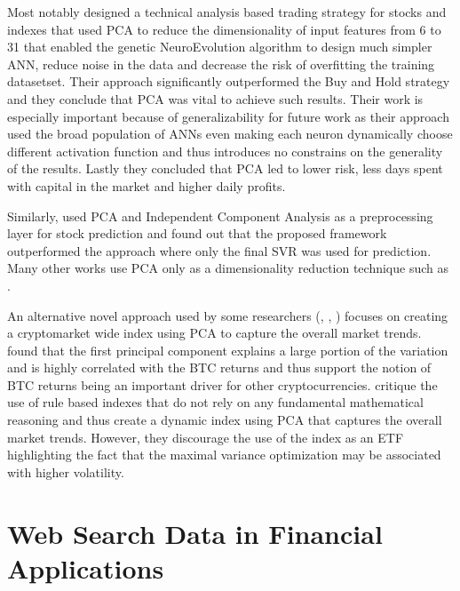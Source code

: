 Most notably \cite{Nadkarni2018} designed a technical analysis based trading 
strategy for stocks and indexes that used \ac{PCA} to reduce the dimensionality
of input features from 6 to 31 that enabled the genetic NeuroEvolution algorithm
to design much simpler \ac{ANN}, reduce noise in the data and decrease 
the risk of overfitting the training datasetset. Their approach significantly 
outperformed the Buy and Hold strategy and they conclude that
\ac{PCA} was vital to achieve such results. Their work is especially important 
because of generalizability for future work as their approach used
the broad population of \ac{ANN}s even making each neuron dynamically
choose different activation function and thus introduces no constrains
on the generality of the results. Lastly they concluded that \ac{PCA} 
led to lower
risk, less days spent with capital in the market and higher daily profits.


Similarly, \cite{Chowdhury2018} used \ac{PCA} and Independent Component 
Analysis as a preprocessing layer for stock prediction and 
found out that the proposed framework outperformed the approach 
where only the final \ac{SVR} was used for prediction. Many
other works use \ac{PCA} only as a dimensionality reduction technique
such as \cite{Toledo2022}.


An alternative novel approach used by some researchers  
(\cite{Shah2021}, \cite{mohsin2021}, \cite{Smales2020})
focuses on creating a cryptomarket wide index using \ac{PCA} to 
capture the overall market trends. \cite{Smales2020} found that 
the first principal component explains a large portion of the variation and 
is highly correlated with the \ac{BTC} returns and thus support the notion
of \ac{BTC} returns being an important driver for other cryptocurrencies.
\cite{Shah2021} critique the use of rule based indexes that do not rely
on any fundamental mathematical reasoning and thus create a dynamic index
using \ac{PCA} that captures the overall market trends. However, they 
discourage the use of the index as an ETF highlighting the fact that the 
maximal variance optimization may be associated with higher volatility.


\section{Web Search Data in Financial Applications}


